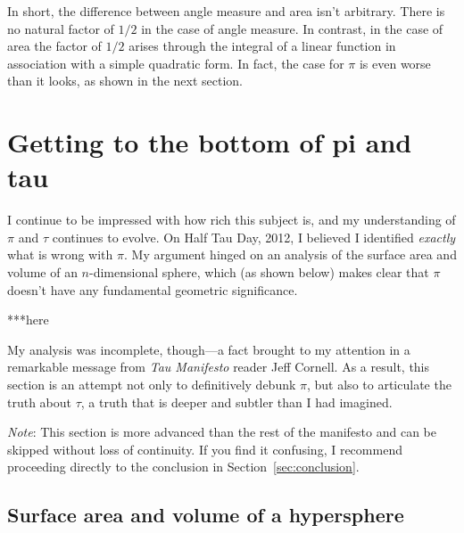 In short, the difference between angle measure and area isn't
arbitrary. \linebreak There is no natural factor of $1/2$ in the
case of angle measure. In contrast, in the case of area the factor of $1/2$ arises through the integral of a linear function in association with a simple quadratic form. In fact, the case for $\pi$ is even worse than it looks, as shown in the next section.


\section{Getting to the bottom of pi and tau} %
\label{sec:getting_to_the_bottom_of_pi}

I continue to be impressed with how rich this subject is, and my understanding of $\pi$ and $\tau$ continues to evolve. On Half Tau Day, 2012, I believed I identified \emph{exactly} what is wrong with $\pi$. My argument hinged on an analysis of the surface area and volume of an $n$-dimensional sphere, which (as shown below) makes clear that $\pi$ doesn't have any fundamental geometric significance.

***here

My analysis was incomplete, though---a fact brought to my attention in a remarkable message from \emph{Tau Manifesto} reader Jeff Cornell. As a result, this section is an attempt not only to definitively debunk $\pi$, but also to articulate the truth about $\tau$, a truth that is deeper and subtler than I had imagined.

\emph{Note}: This section is more advanced than the rest of the manifesto and can be skipped without loss of continuity. If you find it confusing, I recommend proceeding directly to the conclusion in Section~\ref{sec:conclusion}.

  \subsection{Surface area and volume of a hypersphere} %
  \label{sec:volume_of_a_hypersphere}

